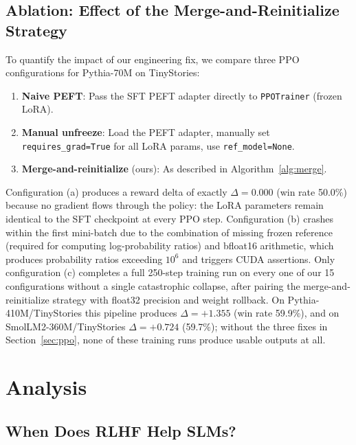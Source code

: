 \documentclass[10pt,twocolumn,letterpaper]{article}
\begin{document}
\subsection{Ablation: Effect of the Merge-and-Reinitialize Strategy}

To quantify the impact of our engineering fix, we compare three PPO configurations for Pythia-70M on TinyStories:

\begin{enumerate}[topsep=2pt, itemsep=1pt, label=\textbf{(\alph*)}]
  \item \textbf{Naive PEFT}: Pass the SFT PEFT adapter directly to \texttt{PPOTrainer} (frozen LoRA).
  \item \textbf{Manual unfreeze}: Load the PEFT adapter, manually set \texttt{requires\_grad=True} for all LoRA params, use \texttt{ref\_model=None}.
  \item \textbf{Merge-and-reinitialize} (ours): As described in Algorithm~\ref{alg:merge}.
\end{enumerate}

Configuration (a) produces a reward delta of exactly $\Delta=0.000$ (win rate 50.0\%) because no gradient flows through the policy: the LoRA parameters remain identical to the SFT checkpoint at every PPO step. Configuration (b) crashes within the first mini-batch due to the combination of missing frozen reference (required for computing log-probability ratios) and bfloat16 arithmetic, which produces probability ratios exceeding $10^6$ and triggers CUDA assertions. Only configuration (c) completes a full 250-step training run on every one of our 15 configurations without a single catastrophic collapse, after pairing the merge-and-reinitialize strategy with float32 precision and weight rollback. On Pythia-410M/TinyStories this pipeline produces $\Delta=+1.355$ (win rate 59.9\%), and on SmolLM2-360M/TinyStories $\Delta=+0.724$ (59.7\%); without the three fixes in Section~\ref{sec:ppo}, none of these training runs produce usable outputs at all.

\section{Analysis}
\label{sec:analysis}

\subsection{When Does RLHF Help SLMs?}
\end{document}
